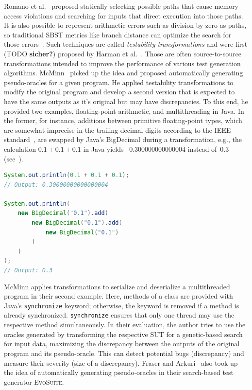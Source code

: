 \documentclass[paper=a4,%
  twoside,%
  BCOR4mm,%
  abstract=true,%
  toc=bibliography,%
  chapterprefix=true,%
  toc=bibliographynumbered,%
  open=right,%
  english,%
  pagesize=pdftex]{scrreprt}
\newcommand{\sut}{\ac{SUT}\xspace}
\begin{document}
Romano et al.~\cite{Romano2011} proposed statically selecting possible paths that cause memory access violations and searching for inputs that direct execution into those paths. It is also possible to represent arithmetic errors such as division by zero as paths, so traditional \ac{SBST} metrics like branch distance can optimize the search for those errors~\cite{Bhattacharya2011}. Such techniques are called \emph{testability transformations} and were first (TODO \textbf{sicher?}) proposed by Harman et al.~\cite{Harman2004}. Those are often source-to-source transformations intended to improve the performance of various test generation algorithms. McMinn~\cite{McMinn2009} picked up the idea and proposed automatically generating pseudo-oracles for a given program. He applied testability transformations to modify the original program and develop a second version that is expected to have the same outputs as it's original but may have discrepancies. To this end, he provided two examples, floating-point arithmetic, and multithreading in Java. In the former, for instance, additions between primitive floating-point types, which are somewhat imprecise in the trailing decimal digits according to the IEEE standard~\cite{10.1145/103162.103163}, are swapped by Java's BigDecimal during a transformation, e.g., the calculation $0.1 + 0.1 + 0.1$ in Java yields ~$0.300000000000004$ instead of~$0.3$ (see~).

\begin{lstlisting}[language=Java, style=boxed, caption={Comparing floating-point arithmetic in Java using double compared to \texttt{BigDecimal}~\cite{McMinn2009}}, label=lst:java-transformations]
System.out.println(0.1 + 0.1 + 0.1);
// Output: 0.30000000000000004

System.out.println(
    new BigDecimal("0.1").add(
        new BigDecimal("0.1").add(
            new BigDecimal("0.1")
        )
    )
);
// Output: 0.3
\end{lstlisting}

McMinn applies transformations to serialize and deserialize a multithreaded program in their second example. Here, methods of a class are provided with Java's \texttt{synchronize} keyword; otherwise, the keyword is removed if a method is already synchronized. \texttt{synchronize} ensures that only one thread may use the respective method simultaneously. In their evaluation, the author tries to use the oracles generated by transforming the respective \sut for a genetic-based search for input data, maximizing the discrepancy between the outputs of the original program and its pseudo-oracle. This can detect potential bugs (discrepancy) and measure their severity (size of a discrepancy). Fraser and Arkuri~\cite{Fraser_2013} also took up the idea of automatically generating pseudo-oracles in their search-based test generator \textsc{EvoSuite}.
\end{document}
